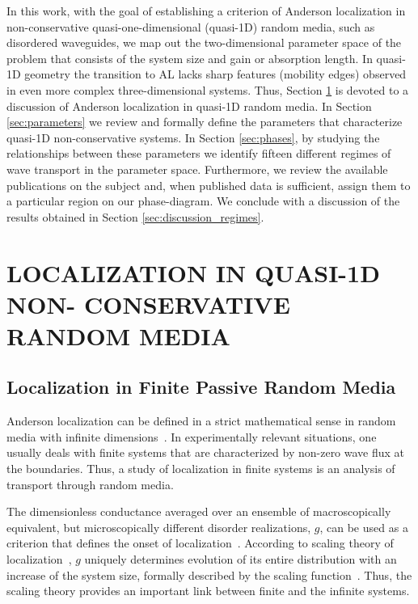 In this work, with the goal of establishing a criterion of Anderson localization in non-conservative quasi-one-dimensional (quasi-1D) random media, such as disordered waveguides, we map out the two-dimensional parameter space of the problem that consists of the system size and gain or absorption length. In quasi-1D geometry the transition to AL lacks sharp features (mobility edges) observed in even more complex three-dimensional systems. Thus,  Section \ref{sec:q1d_localization} is devoted to a discussion of Anderson localization in quasi-1D random media. In Section \ref{sec:parameters} we review and formally define the parameters that characterize quasi-1D non-conservative systems. In Section \ref{sec:phases}, by studying the relationships between these parameters we identify fifteen different regimes of wave transport in the parameter space. Furthermore, we review the available publications on the subject and, when published data is sufficient, assign them to a particular region on our phase-diagram. We conclude with a discussion of the results obtained in Section \ref{sec:discussion_regimes}.

\section{LOCALIZATION IN QUASI-1D NON- CONSERVATIVE RANDOM MEDIA}
\label{sec:q1d_localization}

\subsection{Localization in Finite Passive Random Media}

Anderson localization can be defined in a strict mathematical sense in random media with infinite dimensions~\cite{2010_Spencer}. In experimentally relevant situations, one usually deals with finite systems that are characterized by non-zero wave flux at the boundaries. Thus, a study of localization in finite systems is an analysis of transport through random media. 

The dimensionless conductance averaged over an ensemble of macroscopically equivalent, but microscopically different disorder realizations, $g$, can be used as a criterion that defines the onset of localization~\cite{1977_Thouless}. According to scaling theory of localization~\cite{1979_Anderson}, $g$  uniquely determines  evolution of its entire distribution with an increase of the system size, formally described by the scaling function~\cite{2010_Kramer}. Thus, the scaling theory provides an important link between finite and the infinite systems.

